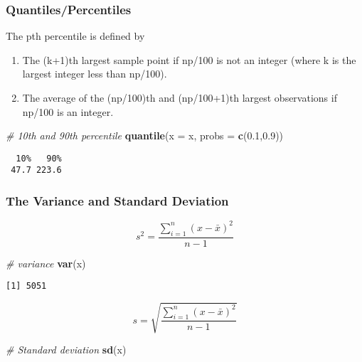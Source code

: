 \documentclass[12pt,]{article}
\newenvironment{Shaded}{\begin{snugshade}}{\end{snugshade}}
\newcommand{\CommentTok}[1]{\textcolor[rgb]{0.56,0.35,0.01}{\textit{#1}}}
\newcommand{\DataTypeTok}[1]{\textcolor[rgb]{0.13,0.29,0.53}{#1}}
\newcommand{\FloatTok}[1]{\textcolor[rgb]{0.00,0.00,0.81}{#1}}
\newcommand{\KeywordTok}[1]{\textcolor[rgb]{0.13,0.29,0.53}{\textbf{#1}}}
\newcommand{\NormalTok}[1]{#1}
\begin{document}
\hypertarget{quantilespercentiles}{%
\subsubsection{Quantiles/Percentiles}\label{quantilespercentiles}}

The pth percentile is defined by

\begin{enumerate}
\def\labelenumi{\arabic{enumi}.}
\item
  The (k+1)th largest sample point if np/100 is not an integer (where k
  is the largest integer less than np/100).
\item
  The average of the (np/100)th and (np/100+1)th largest observations if
  np/100 is an integer.
\end{enumerate}

\begin{Shaded}
\begin{Highlighting}[]
\CommentTok{# 10th and 90th percentile}
\KeywordTok{quantile}\NormalTok{(}\DataTypeTok{x =}\NormalTok{ x, }\DataTypeTok{probs =} \KeywordTok{c}\NormalTok{(}\FloatTok{0.1}\NormalTok{,}\FloatTok{0.9}\NormalTok{))}
\end{Highlighting}
\end{Shaded}

\begin{verbatim}
  10%   90% 
 47.7 223.6 
\end{verbatim}

\hypertarget{the-variance-and-standard-deviation}{%
\subsubsection{The Variance and Standard
Deviation}\label{the-variance-and-standard-deviation}}

\[s^2 = \frac{\sum^n_{i=1}(x-\bar{x})^2}{n-1}\]

\begin{Shaded}
\begin{Highlighting}[]
\CommentTok{# variance}
\KeywordTok{var}\NormalTok{(x)}
\end{Highlighting}
\end{Shaded}

\begin{verbatim}
[1] 5051
\end{verbatim}

\[s = \sqrt{\frac{\sum^n_{i=1}(x-\bar{x})^2}{n-1}}\]

\begin{Shaded}
\begin{Highlighting}[]
\CommentTok{# Standard deviation}
\KeywordTok{sd}\NormalTok{(x)}
\end{Highlighting}
\end{Shaded}
\end{document}
